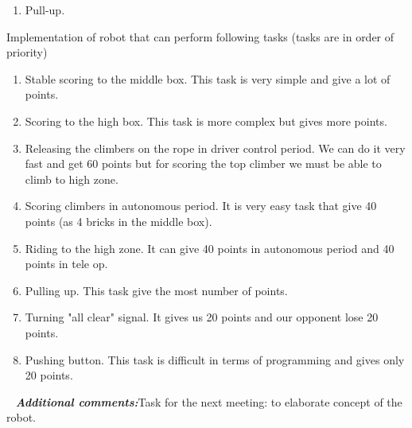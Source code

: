 \begin{enumerate*}
\begin{enumerate}
\begin{enumerate}
	  		\item Pull-up.
  		\end{enumerate}
  	\end{enumerate}
  	\item Implementation of robot that can perform following tasks (tasks are in order of priority)
  	\begin{enumerate}
  		\item Stable scoring to the middle box. This task is very simple and give a lot of points.
  		\item Scoring to the high box. This task is more complex but gives more points.
  		\item Releasing the climbers on the rope in driver control period. We can do it very fast and get 60 points but for scoring the top climber we must be able to climb to high zone.
  		\item Scoring climbers in autonomous period. It is very easy task that give 40 points (as 4 bricks in the middle box).
  		\item Riding to the high zone. It can give 40 points in autonomous period and 40 points in tele op.
  		\item Pulling up. This task give the most number of points.
  		\item Turning "all clear" signal. It gives us 20 points and our opponent lose 20 points.
  		\item Pushing button. This task is difficult in terms of programming and gives only 20 points.
  	\end{enumerate}
	
	 \newline
	\textit{\textbf{Additional comments:}}Task for the next meeting: to elaborate concept of the robot.
  	
  \end{enumerate*}
  

  


\fillpage
